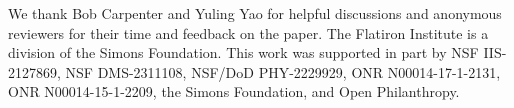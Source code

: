 \begin{ack}
We thank Bob Carpenter and Yuling Yao for helpful discussions
and  anonymous reviewers for their time and feedback on the paper.
The Flatiron Institute is a division
of the Simons Foundation.
This work was supported in
part by NSF IIS-2127869, NSF DMS-2311108, NSF/DoD PHY-2229929, ONR N00014-17-1-2131,
ONR N00014-15-1-2209, the Simons Foundation, and Open Philanthropy.
\end{ack}
